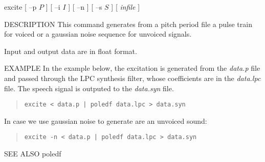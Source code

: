 
\begin{synopsis}
\item [excite] [ --p $P$ ] [ --i $I$ ] [ --n ] [ --s $S$ ] [ {\em infile} ]
\end{synopsis}

\begin{qsection}{DESCRIPTION}
This command generates from a pitch period file a pulse train for voiced
or a gaussian noise sequence for unvoiced signals.
\par
Input and output data are in float format.
\end{qsection}

\begin{options}
\end{options}

\begin{qsection}{EXAMPLE}
In the example below, the excitation is generated from the
{\em data.p} file and passed through the LPC synthesis filter,
whose coefficients are in the {\em data.lpc} file.
The speech signal is outputed to the {\em data.syn} file.
\begin{quote}
 \verb!excite < data.p | poledf data.lpc > data.syn!
\end{quote} 
In case we use gaussian noise to generate are an unvoiced sound:
\begin{quote}
 \verb!excite -n < data.p | poledf data.lpc > data.syn!
\end{quote}
\end{qsection}

\begin{qsection}{SEE ALSO}
 poledf
\end{qsection}
